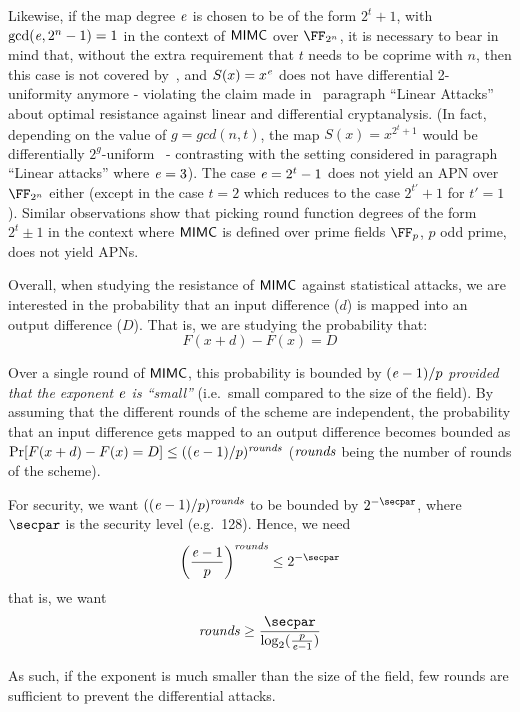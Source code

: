 Likewise, if the map degree $\mathit{e}{}$ is chosen to be of the form $2^t + 1$, with $\gcd(\mathit{e}{}, 2^n - 1) = 1$ in the context of $\mathsf{MIMC{}}$ over $\FFx{2^n}$, it is necessary to bear in mind that, without the extra requirement that $t$ needs to be coprime with $n$, then this case is not covered by~\cite[Theorem 2]{DBLP:journals/tit/HellesethRS99}, and $S(x) = x^{\mathit{e}}{}$ does not have differential 2-uniformity anymore - violating the claim made in~\cite[Section 4.2]{albrecht2016mimc} paragraph ``Linear Attacks'' about optimal resistance against linear and differential cryptanalysis. (In fact, depending on the value of $g = gcd(n, t)$, the map $S(x) = x^{2^t + 1}$ would be differentially $2^g$-uniform~\cite{DBLP:conf/eurocrypt/Nyberg93} - contrasting with the setting considered in paragraph ``Linear attacks'' where $\mathit{e}{} = 3$).
The case $\mathit{e}{} = 2^t - 1$ does not yield an APN over $\FFx{2^n}$ either (except in the case $t = 2$ which reduces to the case $2^{t'} + 1$ for $t' = 1$). Similar observations show that picking round function degrees of the form $2^t \pm 1$ in the context where $\mathsf{MIMC{}}$ is defined over prime fields $\FFx{p}$, $p$ odd prime, does not yield APNs.

\medskip

Overall, when studying the resistance of $\mathsf{MIMC{}}$ against statistical attacks, we are interested in the probability that an input difference ($d$) is mapped into an output difference ($D$). That is, we are studying the probability that:
\[
    F(x + d) - F(x) = D
\]

Over a single round of $\mathsf{MIMC{}}$, this probability is bounded by $(\mathit{e}{}-1)/p$ \emph{provided that the exponent $\mathit{e}{}$ is ``small''} (i.e.~small compared to the size of the field).
By assuming that the different rounds of the scheme are independent, the probability that an input difference gets mapped to an output difference becomes bounded as $\Pr[F(x + d) - F(x) = D] \leq ((\mathit{e}{}-1)/p)^{\mathit{rounds}}$ ($\mathit{rounds}$ being the number of rounds of the scheme).

For security, we want $((\mathit{e}{}-1)/p)^{\mathit{rounds}}$ to be bounded by $2^{-\secpar}$, where $\secpar$ is the security level (e.g.~128). Hence, we need
\[
    \left(\frac{\exponent{}-1}{p}\right)^\rounds \leq 2^{-\secpar}
\]
that is, we want
\[
    \rounds \geq \frac{\secpar}{\log_2(\frac{p}{\exponent{}-1})}
\]

As such, if the exponent is much smaller than the size of the field, few rounds are sufficient to prevent the differential attacks.

